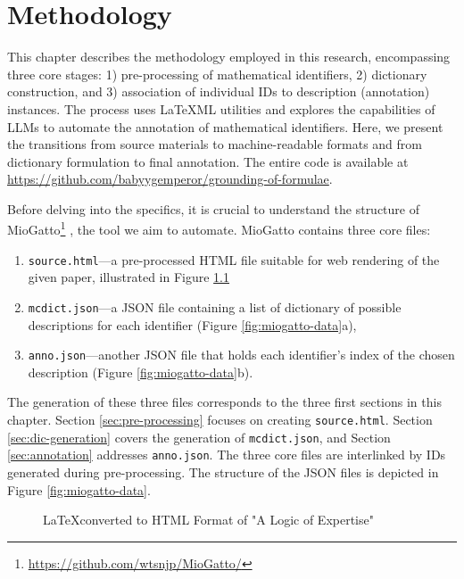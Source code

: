 \chapter{Methodology}\label{chapter:methods}

This chapter describes the methodology employed in this research, encompassing three core stages: 1) pre-processing of mathematical identifiers, 2) dictionary construction, and 3) association of individual IDs to description (annotation) instances. The process uses \LaTeX ML utilities and explores the capabilities of \ac{LLMs} to automate the annotation of mathematical identifiers. Here, we present the transitions from source materials to machine-readable formats and from dictionary formulation to final annotation. The entire code is available at \url{https://github.com/babyygemperor/grounding-of-formulae}.

Before delving into the specifics, it is crucial to understand the structure of \\ MioGatto\footnote{\url{https://github.com/wtsnjp/MioGatto/}} \citep{asakura2021miogatto}, the tool we aim to automate. MioGatto contains three core files: 
\begin{enumerate}
    \item \texttt{source.html}—a pre-processed HTML file suitable for web rendering of the given paper, illustrated in Figure \ref{fig:miogatto-sources}
    \item \texttt{mcdict.json}—a JSON file containing a list of dictionary of possible descriptions for each identifier (Figure \ref{fig:miogatto-data}a), 
    \item \texttt{anno.json}—another JSON file that holds each identifier's index of the chosen description (Figure \ref{fig:miogatto-data}b).
\end{enumerate}

The generation of these three files corresponds to the three first sections in this chapter. 
Section \ref{sec:pre-processing} focuses on creating \texttt{source.html}. 
Section \ref{sec:dic-generation} covers the generation of \texttt{mcdict.json}, and Section \ref{sec:annotation} addresses \texttt{anno.json}. The three core files are interlinked by IDs generated during pre-processing. The structure of the JSON files is depicted in Figure \ref{fig:miogatto-data}.

\begin{figure}[htpb]
  \centering
    \begin{minipage}{1\textwidth}
      
    \end{minipage}
  \caption[LaTeXML Pre-processing]{\LaTeX \space converted to HTML Format of "A Logic of Expertise" \citep{singleton2021logic}}\label{fig:miogatto-sources}
\end{figure}


